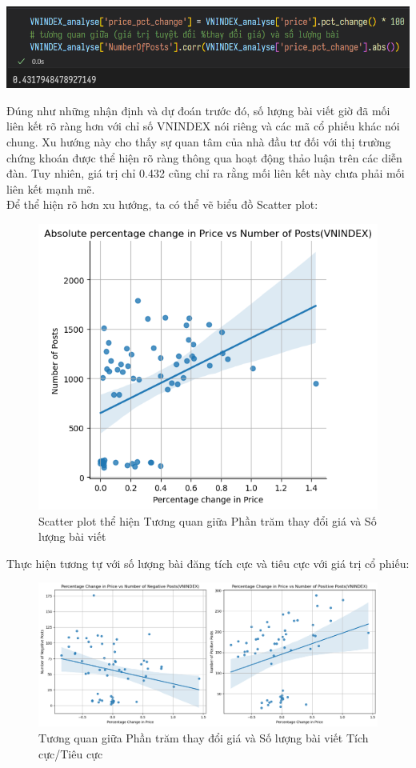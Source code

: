 \begin{center}
\includegraphics[width=0.75\linewidth]{images/C4_3.png}
\end{center}

Đúng như những nhận định và dự đoán trước đó, số lượng bài viết giờ đã mối liên kết rõ ràng hơn với chỉ số VNINDEX nói riêng và các mã cổ phiếu khác nói chung. Xu hướng này cho thấy sự quan tâm của nhà đầu tư đối với thị trường chứng khoán được thể hiện rõ ràng thông qua hoạt động thảo luận trên các diễn đàn. Tuy nhiên, giá trị chỉ 0.432 cũng chỉ ra rằng mối liên kết này chưa phải mối liên kết mạnh mẽ.\\

Để thể hiện rõ hơn xu hướng, ta có thể vẽ biểu đồ Scatter plot:
\begin{figure}[H]
    \centering
    \includegraphics[width=0.55\linewidth]{images/C4_5.png}
    \vspace{-1em}
    \caption{Scatter plot thể hiện Tương quan giữa Phần trăm thay đổi giá và Số lượng bài viết}
    \label{fig:4.4}
\end{figure}

Thực hiện tương tự với số lượng bài đăng tích cực và tiêu cực với giá trị cổ phiếu:

\begin{figure}[H]
    \centering
    \includegraphics[width=1\linewidth]{images/C4_6.png}
    \caption{Tương quan giữa Phần trăm thay đổi giá và Số lượng bài viết Tích cực/Tiêu cực}
    \label{fig:4.5}
\end{figure}

